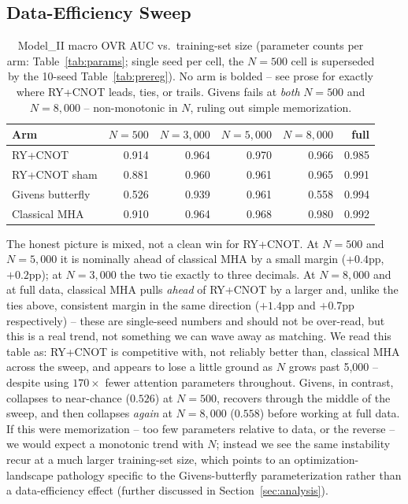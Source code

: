 \documentclass[10pt,letterpaper]{article}
\theoremstyle{plain}
\theoremstyle{definition}
\begin{document}
\subsection{Data-Efficiency Sweep}
\label{sec:sweep}

\begin{table}[h]
\centering\small
\begin{tabular}{@{}lrrrrr@{}}
\toprule
Arm & $N{=}500$ & $N{=}3{,}000$ & $N{=}5{,}000$ & $N{=}8{,}000$ & full \\
\midrule
RY+CNOT & 0.914 & 0.964 & 0.970 & 0.966 & 0.985 \\
RY+CNOT sham & 0.881 & 0.960 & 0.961 & 0.965 & 0.991 \\
Givens butterfly & 0.526 & 0.939 & 0.961 & 0.558 & 0.994 \\
Classical MHA & 0.910 & 0.964 & 0.968 & 0.980 & 0.992 \\
\bottomrule
\end{tabular}
\caption{Model\_II macro OVR AUC vs.\ training-set size (parameter counts
per arm: Table~\ref{tab:params}; single seed per cell, the $N{=}500$ cell
is superseded by the 10-seed Table~\ref{tab:prereg}). No arm is bolded --
see prose for exactly where RY+CNOT leads, ties, or trails. Givens fails
at \emph{both} $N{=}500$ and $N{=}8{,}000$ -- non-monotonic in $N$,
ruling out simple memorization.}
\label{tab:sweep}
\end{table}

The honest picture is mixed, not a clean win for RY+CNOT. At $N{=}500$
and $N{=}5{,}000$ it is nominally ahead of classical MHA by a small
margin ($+0.4$pp, $+0.2$pp); at $N{=}3{,}000$ the two tie exactly to three
decimals. At $N{=}8{,}000$ and at full data, classical MHA pulls
\emph{ahead} of RY+CNOT by a larger and, unlike the ties above,
consistent margin in the same direction ($+1.4$pp and $+0.7$pp
respectively) -- these are single-seed numbers and should not be
over-read, but this is a real trend, not something we can wave away as
matching. We read this table as: RY+CNOT is competitive with, not
reliably better than, classical MHA across the sweep, and appears to lose
a little ground as $N$ grows past 5,000 -- despite using $170\times$
fewer attention parameters throughout. Givens, in contrast,
collapses to near-chance ($0.526$) at $N{=}500$, recovers through the
middle of the sweep, and then collapses \emph{again} at $N{=}8{,}000$
($0.558$) before working at full data. If this were memorization -- too
few parameters relative to data, or the reverse -- we would expect a
monotonic trend with $N$; instead we see the same instability recur at a
much larger training-set size, which points to an optimization-landscape
pathology specific to the Givens-butterfly parameterization rather than a
data-efficiency effect (further discussed in Section~\ref{sec:analysis}).
\end{document}
